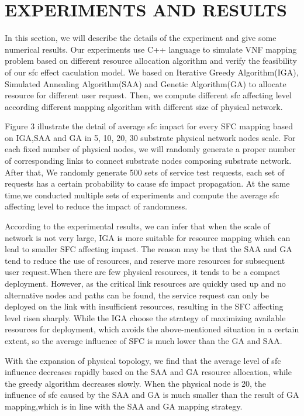 \documentclass{ieeeaccess}
\begin{document}
\section{EXPERIMENTS AND RESULTS}
In this section, we will describe the details of the experiment and give some numerical results. Our experiments use C++ language to simulate VNF mapping problem based on different resource allocation algorithm and verify the feasibility of our sfc effect caculation model. We based on Iterative Greedy Algorithm(IGA), Simulated Annealing Algorithm(SAA) and Genetic Algorithm(GA) to allocate resource for different user request. Then, we compute different sfc affecting level according different mapping algorithm with different size of physical network.

Figure 3 illustrate the detail of average sfc impact for every SFC mapping based on IGA,SAA and GA in 5, 10, 20, 30 substrate physical network nodes scale. For each fixed number of physical nodes, we will randomly generate a proper number of corresponding links to connect substrate nodes composing substrate network. After that, We randomly generate 500 sets of service test requests, each set of requests has a certain probability to cause sfc impact propagation. At the same time,we conducted multiple sets of experiments and compute the average sfc affecting level to reduce the impact of randomness.

According to the experimental results, we can infer that when the scale of network is not very large, IGA is more suitable for resource mapping which can lead to smaller SFC affecting impact. The reason may be that the SAA and GA tend to reduce the use of resources, and reserve more resources for subsequent user request.When there are few physical resources, it tends to be a compact deployment. However, as the critical link resources are quickly used up and no alternative nodes and paths can be found, the service request can only be deployed on the link with insufficient resources, resulting in the SFC affecting level risen sharply. While the IGA choose the strategy of maximizing available resources for deployment, which avoids the above-mentioned situation in a certain extent, so the average influence of SFC is much lower than the GA and SAA.

With the expansion of physical topology, we find that the average level of sfc influence decreases rapidly based on the SAA and GA resource allocation, while the greedy algorithm decreases slowly. When the physical node is 20, the influence of sfc caused by the SAA and GA  is much smaller than the result of GA mapping,which is in line with the SAA and GA mapping strategy.
\end{document}
